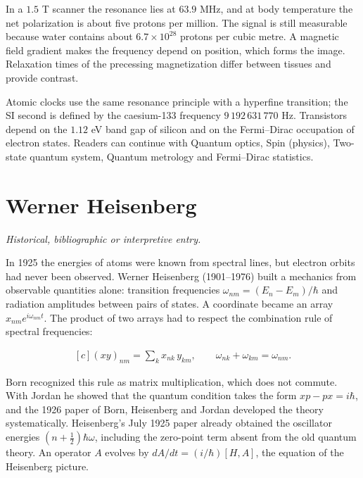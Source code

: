 \documentclass[11pt,oneside]{book}
\newenvironment{centeredalign}{\[\begin{gathered}[c]}{\end{gathered}\]}
\begin{document}
In a \(1.5\) T scanner the resonance lies at \(63.9\) MHz, and at body temperature the net polarization is about five protons per million. The signal is still measurable because water contains about \(6.7\times10^{28}\) protons per cubic metre. A magnetic field gradient makes the frequency depend on position, which forms the image. Relaxation times of the precessing magnetization differ between tissues and provide contrast.

Atomic clocks use the same resonance principle with a hyperfine transition; the SI second is defined by the caesium-133 frequency \(9\,192\,631\,770\) Hz. Transistors depend on the \(1.12\) eV band gap of silicon and on the Fermi--Dirac occupation of electron states. Readers can continue with Quantum optics, Spin (physics), Two-state quantum system, Quantum metrology and Fermi--Dirac statistics.







\clearpage

\section{Werner Heisenberg}

\label{topic:werner-heisenberg}

\par\smallskip\noindent\textit{Historical, bibliographic or interpretive entry.}

In 1925 the energies of atoms were known from spectral lines, but electron orbits had never been observed. Werner Heisenberg (1901--1976) built a mechanics from observable quantities alone: transition frequencies \(\omega_{nm}=(E_n-E_m)/\hbar\) and radiation amplitudes between pairs of states. A coordinate became an array \(x_{nm}e^{i\omega_{nm}t}\). The product of two arrays had to respect the combination rule of spectral frequencies:

\begin{centeredalign}
(xy)_{nm}=\sum_k x_{nk}\,y_{km},\qquad \omega_{nk}+\omega_{km}=\omega_{nm} .
\end{centeredalign}

Born recognized this rule as matrix multiplication, which does not commute. With Jordan he showed that the quantum condition takes the form \(xp-px=i\hbar\), and the 1926 paper of Born, Heisenberg and Jordan developed the theory systematically. Heisenberg's July 1925 paper already obtained the oscillator energies \((n+\tfrac12)\hbar\omega\), including the zero-point term absent from the old quantum theory. An operator \(A\) evolves by \(dA/dt=(i/\hbar)[H,A]\), the equation of the Heisenberg picture.
\end{document}
